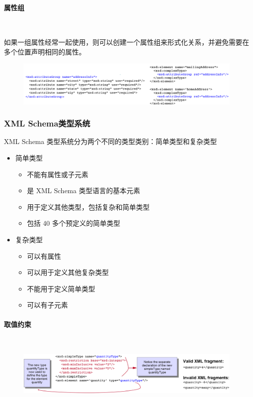 \paragraph*{属性组}~{} \par
如果一组属性经常一起使用，则可以创建一个属性组来形式化关系，并避免需要在多个位置声明相同的属性。
\begin{figure}[H]
    \vspace{-0.5em}
	\centering
	\includegraphics[width=\textwidth]{images/属性组}
    \vspace{-2em}
\end{figure}

\subsubsection{XML Schema类型系统}
XML Schema 类型系统分为两个不同的类型类别：简单类型和复杂类型
\vspace{-0.8em}
\begin{multicols}{2}
    \begin{itemize}
		\item 简单类型
		\begin{itemize}
			\item 不能有属性或子元素
			\item 是 XML Schema 类型语言的基本元素
			\item 用于定义其他类型，包括复杂和简单类型
			\item 包括 40 多个预定义的简单类型
		\end{itemize}
		\item 复杂类型
		\begin{itemize}
			\item 可以有属性
			\item 可以用于定义其他复杂类型
			\item 不能用于定义简单类型
			\item 可以有子元素
		\end{itemize}
    \end{itemize}
\end{multicols}
\vspace{-1em}

\paragraph*{取值约束}~{} \par
\begin{figure}[H]
    \vspace{-0.5em}
	\centering
	\includegraphics[width=\textwidth]{images/取值约束}
    \vspace{-2em}
\end{figure}

